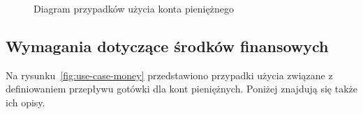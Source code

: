 \begin{figure}[t]
	\centering
	\caption{Diagram przypadków użycia konta pieniężnego}
	\label{fig:use-case-account}
\end{figure}

\subsection{Wymagania dotyczące środków finansowych}
\label{subsec:wymagania-srodki-finansowe}
Na rysunku~\ref{fig:use-case-money} przedstawiono przypadki użycia związane z definiowaniem przepływu gotówki dla kont pieniężnych. Poniżej znajdują się także ich opisy.

